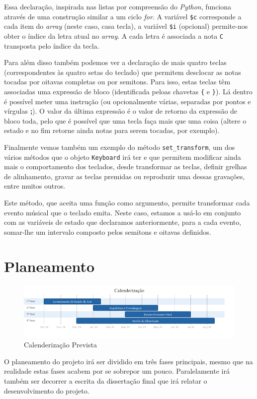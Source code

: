 \documentclass[
  oneside,
  11pt, a4paper,
  footinclude=true,
  headinclude=true,
  cleardoublepage=empty
]{scrbook}
\begin{document}
    Essa declaração, inspirada nas listas por compreensão do \textit{Python}, funciona através de uma construção similar a um ciclo \textit{for}. A variável \texttt{\$c} corresponde a cada item do \textit{array} (neste caso, casa tecla), a variável \texttt{\$i} (opcional) permite-nos obter o índice da letra atual no \textit{array}. A cada letra é associada a nota \texttt{C} transposta pelo índice da tecla.
    
    Para além disso também podemos ver a declaração de mais quatro teclas (correspondentes às quatro setas do teclado) que permitem desclocar as notas tocadas por oitavas completas ou por semitons. Para isso, estas teclas têm associadas uma expressão de bloco (identificada peloas chavetas \texttt{\{} e \texttt{\}}). Lá dentro é possível meter uma instrução (ou opcionalmente várias, separadas por pontos e vírgulas \textbf{;}). O valor da última expressão é o valor de retorno da expressão de bloco toda, pelo que é possível que uma tecla faça mais que uma coisa (altere o estado e no fim retorne ainda notas para serem tocadas, por exemplo).
    
    Finalmente vemos também um exemplo do método \texttt{set\_transform}, um dos vários métodos que o objeto \texttt{Keyboard} irá ter e que permitem modificar ainda mais o comportamento dos teclados, desde transformar as teclas, definir grelhas de alinhamento, gravar as teclas premidas ou reproduzir uma dessas gravações, entre muitos outros.
    
    Este método, que aceita uma função como argumento, permite transformar cada evento músical que o teclado emita. Neste caso, estamos a usá-lo em conjunto com as variáveis de estado que declaramos anteriormente, para a cada evento, somar-lhe um intervalo composto pelos semitons e oitavas definidos.
    
    
	\chapter{Planeamento}
	\begin{figure}[h]
	\begin{center}
		\includegraphics[width=1\textwidth]{img/diagram_calendarization.png}
	\end{center}
	\caption{Calenderização Prevista}
	\end{figure}
	O planeamento do projeto irá ser dividido em três fases principais, mesmo que na realidade estas fases acabem por se sobrepor um pouco. Paralelamente irá também ser decorrer a escrita da dissertação final que irá relatar o desenvolvimento do projeto.
	
\end{document}
